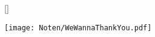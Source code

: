 []

\markboth{\songtitle}{\songtitle}

\beginverse
\endverse

\centering\texttt{[image: Noten/WeWannaThankYou.pdf]}

\endsong

\beginscripture

\endscripture

\begin{intersong}

\end{intersong}